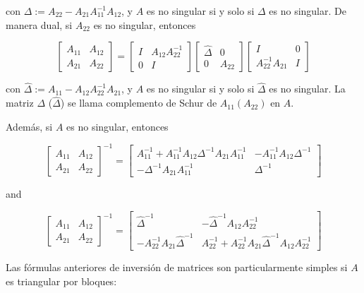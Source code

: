 con $\Delta:=A_{22}-A_{21} A_{11}^{-1} A_{12}$, y $A$ es no singular si y solo si $\Delta$ es no singular. De manera dual, si $A_{22}$ es no singular, entonces

$$
\left[\begin{array}{ll}
A_{11} & A_{12} \\
A_{21} & A_{22}
\end{array}\right]=\left[\begin{array}{cc}
I & A_{12} A_{22}^{-1} \\
0 & I
\end{array}\right]\left[\begin{array}{cc}
\hat{\Delta} & 0 \\
0 & A_{22}
\end{array}\right]\left[\begin{array}{cc}
I & 0 \\
A_{22}^{-1} A_{21} & I
\end{array}\right]
$$

con $\hat{\Delta}:=A_{11}-A_{12} A_{22}^{-1} A_{21}$, y $A$ es no singular si y solo si $\hat{\Delta}$ es no singular. La matriz $\Delta$ ($\hat{\Delta}$) se llama complemento de Schur de $A_{11}\left(A_{22}\right)$ en $A$.

Además, si $A$ es no singular, entonces

$$
\left[\begin{array}{ll}
A_{11} & A_{12} \\
A_{21} & A_{22}
\end{array}\right]^{-1}=\left[\begin{array}{cc}
A_{11}^{-1}+A_{11}^{-1} A_{12} \Delta^{-1} A_{21} A_{11}^{-1} & -A_{11}^{-1} A_{12} \Delta^{-1} \\
-\Delta^{-1} A_{21} A_{11}^{-1} & \Delta^{-1}
\end{array}\right]
$$

and

$$
\left[\begin{array}{ll}
A_{11} & A_{12} \\
A_{21} & A_{22}
\end{array}\right]^{-1}=\left[\begin{array}{cc}
\hat{\Delta}^{-1} & -\hat{\Delta}^{-1} A_{12} A_{22}^{-1} \\
-A_{22}^{-1} A_{21} \hat{\Delta}^{-1} & A_{22}^{-1}+A_{22}^{-1} A_{21} \hat{\Delta}^{-1} A_{12} A_{22}^{-1}
\end{array}\right]
$$

Las fórmulas anteriores de inversión de matrices son particularmente simples si $A$ es triangular por bloques:

